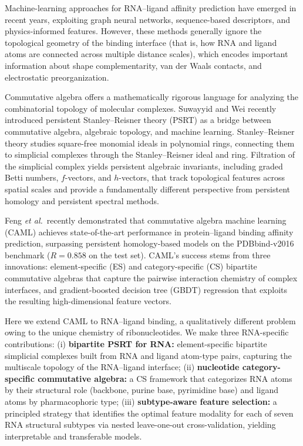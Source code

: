\documentclass[10pt,twocolumn]{article}
\begin{document}
Machine-learning approaches for RNA--ligand affinity prediction have emerged in
recent years, exploiting graph neural networks,\cite{AffiGrapher2023,Kuzmin2021,Zhou2023}
sequence-based descriptors,\cite{RSAPred2022} and physics-informed features.\cite{RLASIF2023}
However, these methods generally ignore the topological geometry of the binding
interface (that is, how RNA and ligand atoms are connected across multiple distance
scales), which encodes important information about shape complementarity, van der Waals
contacts, and electrostatic preorganization.

Commutative algebra offers a mathematically rigorous language for analyzing the
combinatorial topology of molecular complexes.
Suwayyid and Wei recently introduced persistent Stanley--Reisner theory (PSRT) as a
bridge between commutative algebra, algebraic topology, and machine
learning.\cite{PSRT2024}
Stanley--Reisner theory studies square-free monomial ideals in polynomial rings,
connecting them to simplicial complexes through the Stanley--Reisner ideal and
ring.\cite{Miller2005,Bruns1998}
Filtration of the simplicial complex yields persistent algebraic invariants, including
graded Betti numbers, $f$-vectors, and $h$-vectors, that track topological features
across spatial scales and provide a fundamentally different perspective from persistent
homology\cite{Edelsbrunner2002,Zomorodian2005} and persistent spectral methods.\cite{Wee2023,Cang2018}

Feng \textit{et al.}\ recently demonstrated that commutative algebra machine learning
(CAML) achieves state-of-the-art performance in protein--ligand binding affinity
prediction, surpassing persistent homology-based models on the PDBbind-v2016 benchmark
($R = 0.858$ on the test set).\cite{FengCAML2025}
CAML's success stems from three innovations: element-specific (ES) and
category-specific (CS) bipartite commutative algebras that capture the pairwise
interaction chemistry of complex interfaces, and gradient-boosted decision tree (GBDT)
regression that exploits the resulting high-dimensional feature vectors.

Here we extend CAML to RNA--ligand binding, a qualitatively different problem
owing to the unique chemistry of ribonucleotides.
We make three RNA-specific contributions:
(i) \textbf{bipartite PSRT for RNA:} element-specific bipartite simplicial
complexes built from RNA and ligand atom-type pairs, capturing the multiscale
topology of the RNA--ligand interface;
(ii) \textbf{nucleotide category-specific commutative algebra:} a CS
framework that categorizes RNA atoms by their structural role (backbone, purine
base, pyrimidine base) and ligand atoms by pharmacophoric type;
(iii) \textbf{subtype-aware feature selection:} a principled strategy that
identifies the optimal feature modality for each of seven RNA structural
subtypes via nested leave-one-out cross-validation, yielding interpretable
and transferable models.
\end{document}
